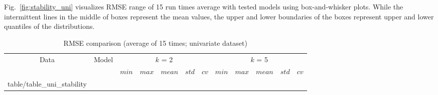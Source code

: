 \documentclass[smallcondensed, natbib]{svjour3}     %
\makeatletter
\newcommand\primitiveinput[1]
		{\@@input #1 }
\makeatother
\begin{document}
{Fig.~\ref{fig:stability_uni} visualizes RMSE range of 15 run times average with tested models using box-and-whisker plots. While the intermittent lines in the middle of boxes represent the mean values, the upper and lower boundaries of the boxes represent upper and lower quantiles of the distributions. 



\begin{table}[h]
	\caption{RMSE comparison (average of 15 times; univariate dataset)}
	\label{table:uni_stability}
	\centering
	\begin{adjustbox}{width=\textwidth}
		\begin{tabular}{| c | c| c | c | c | c | c | c | c | c | c | c |}%
		\hline
			 \multirow{2}{*}{Data} & \multirow{2}{*}{Model} & \multicolumn{5}{c|}{$k$ = 2} & \multicolumn{5}{c|}{ $k$ = 5 } \\ 
			 \cline{3-12}
	   		& & $min$ & $max$ & $mean$ & $std$ & $cv$ &   $min$ & $max$ & $mean$ & $std$ & $cv$ \\ [0.5ex] 
		\hline
			\primitiveinput{table/table_uni_stability}
		\hline
		\end{tabular}
	\end{adjustbox}
\end{table}



}
\end{document}
